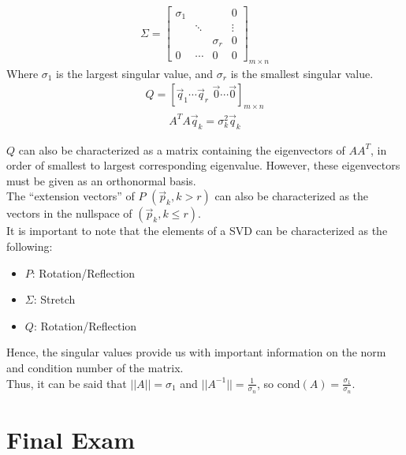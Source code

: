 \documentclass{article}
\newcommand{\gap}{\medskip\\}
\begin{document}
\begin{multicols}{2}
    \begin{align*}
        \Sigma = \begin{bmatrix}
            \sigma_1 & & & 0\\
            & \ddots & & \vdots \\
            & & \sigma_r & 0\\
            0 & \cdots & 0 & 0
        \end{bmatrix}_{m \times n}
    \end{align*}
    Where $\sigma_1$ is the largest singular value, and $\sigma_r$ is the smallest singular value.
    \vfill\null\columnbreak
    \begin{align*}
        Q = [\vec{q}_1 \cdots \vec{q}_r \, \, \vec{0} \cdots \vec{0}]_{m \times n}
    \end{align*}
    \begin{align*}
        A^TA \vec{q}_k = \sigma_k^2 \vec{q}_k
    \end{align*}
    \vfill\null
\end{multicols}
$Q$ can also be characterized as a matrix containing the eigenvectors of $AA^T$,
in order of smallest to largest corresponding eigenvalue. However, these eigenvectors 
must be given as an orthonormal basis. 
\gap
The ``extension vectors'' of $P$ $(\vec{p}_k, k > r)$ can also be characterized
as the vectors in the nullspace of $(\vec{p}_k, k \leq r)$. 
\gap
It is important to note that the elements of a SVD can be characterized as the
following:
\begin{itemize}
    \item $P$: Rotation/Reflection
    \item $\Sigma$: Stretch
    \item $Q$: Rotation/Reflection
\end{itemize}
Hence, the singular values provide us with important information on the norm 
and condition number of the matrix. 
\gap
Thus, it can be said that $||A|| = \sigma_1$ and $||A^{-1}|| = \frac{1}{\sigma_n}$,
so $\textrm{cond}(A) = \frac{\sigma_1}{\sigma_n}$.

\pagebreak

\section*{Final Exam}
\end{document}
